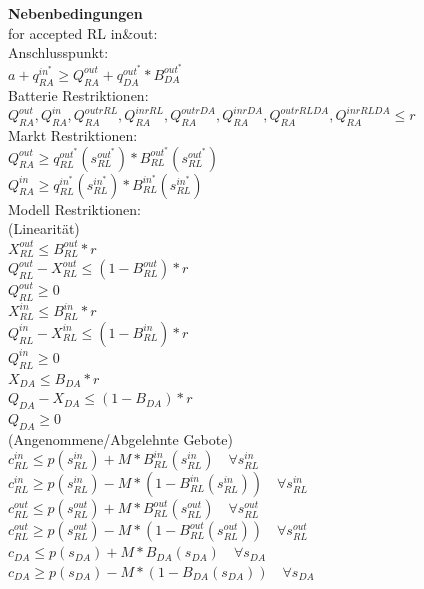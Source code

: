 \documentclass{article}
\begin{document}
\textbf{Nebenbedingungen}\\
for accepted RL in\&out:\\
Anschlusspunkt:\\
$a + q^{in^*}_{RA} \geq Q^{out}_{RA} + q^{out^*}_{DA} * B^{out^*}_{DA}$ \\
Batterie Restriktionen:\\
$Q^{out}_{RA}, Q^{in}_{RA}, Q^{outrRL}_{RA}, Q^{inrRL}_{RA}, Q^{outrDA}_{RA}, Q^{inrDA}_{RA}, Q^{outrRLDA}_{RA}, Q^{inrRLDA}_{RA} \leq r$\\
Markt Restriktionen:\\
$Q^{out}_{RA} \geq q^{out^*}_{RL} (s^{out^*}_{RL}) * B^{out^*}_{RL} (s^{out^*}_{RL}) $\\
$Q^{in}_{RA} \geq q^{in^*}_{RL} (s^{in^*}_{RL}) * B^{in^*}_{RL} (s^{in^*}_{RL}) $\\
Modell Restriktionen:\\
(Linearität)\\
$X^{out}_{RL} \leq B^{out}_{RL} * r$ \\
$Q^{out}_{RL} - X^{out}_{RL} \leq (1-B^{out}_{RL}) * r$ \\
$Q^{out}_{RL} \geq 0$ \\
$X^{in}_{RL} \leq B^{in}_{RL} * r$ \\
$Q^{in}_{RL} - X^{in}_{RL} \leq (1-B^{in}_{RL}) * r$ \\
$Q^{in}_{RL} \geq 0$ \\
$X_{DA} \leq B_{DA} * r$ \\
$Q_{DA} - X_{DA} \leq (1-B_{DA}) * r$ \\
$Q_{DA} \geq 0$ \\
(Angenommene/Abgelehnte Gebote)\\
$c^{in}_{RL} \leq p(s^{in}_{RL}) + M * B^{in}_{RL}(s^{in}_{RL})\quad\forall s^{in}_{RL} $ \\
$c^{in}_{RL} \geq p(s^{in}_{RL}) - M * (1 - B^{in}_{RL}(s^{in}_{RL}))\quad\forall s^{in}_{RL} $ \\
$c^{out}_{RL} \leq p(s^{out}_{RL}) + M * B^{out}_{RL}(s^{out}_{RL})\quad\forall s^{out}_{RL} $ \\
$c^{out}_{RL} \geq p(s^{out}_{RL}) - M * (1 - B^{out}_{RL}(s^{out}_{RL}))\quad\forall s^{out}_{RL} $ \\
$c_{DA} \leq p(s_{DA}) + M * B_{DA}(s_{DA})\quad\forall s_{DA} $ \\
$c_{DA} \geq p(s_{DA}) - M * (1 - B_{DA}(s_{DA}))\quad\forall s_{DA} $ \\
\end{document}
